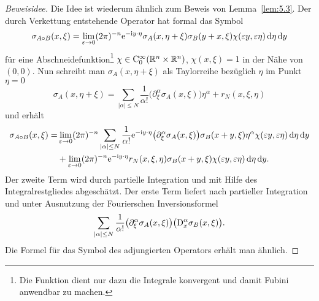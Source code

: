 \begin{proof}[Beweisidee] Die Idee ist wiederum ähnlich zum Beweis von Lemma~\ref{lem:5.3}. Der durch Verkettung entstehende Operator hat formal das Symbol
\begin{equation}
    \sigma_{A\circ B}(x,\xi) = \lim_{\varepsilon\to0}  (2\pi)^{-n} \relax \mathrm e^{-\mathrm i y\cdot\eta  } \sigma_A(x,\eta+\xi) \sigma_B(y+x,\xi) \chi(\varepsilon y,\varepsilon\eta) \,\mathrm d\eta\,\mathrm d y
\end{equation}
für eine Abschneidefunktion\footnote{Die Funktion dient nur dazu die Integrale konvergent und damit Fubini anwendbar zu machen.} $\chi\in\mathrm C_0^\infty(\mathbb R^{n}\times\mathbb R^n)$, $\chi(x,\xi)=1$ in der Nähe von $(0,0)$. Nun schreibt man $\sigma_A(x,\eta+\xi)$ als Taylorreihe bezüglich $\eta$ im Punkt $\eta=0$ 
\begin{equation}
   \sigma_A(x,\eta+\xi) = \sum_{|\alpha|\le N} \frac1{\alpha!} \big(\partial_\xi^\alpha \sigma_A(x,\xi)\big) \eta^\alpha + r_N(x,\xi,\eta)
\end{equation}
und erhält
\begin{equation}
\begin{split}
  \sigma_{A\circ B}(x,\xi) =& \lim_{\varepsilon\to0}  (2\pi)^{-n}  \sum_{|\alpha|\le N}  \frac1{\alpha!} \relax \mathrm e^{-\mathrm i y\cdot\eta  }  \big(\partial_\xi^\alpha \sigma_A(x,\xi)\big) \sigma_B(x+y,\xi)  \eta^\alpha \chi(\varepsilon y, \varepsilon \eta)\,\mathrm d\eta\,\mathrm d y \\
  &+ \lim_{\varepsilon\to0}  (2\pi)^{-n}  \relax \mathrm e^{-\mathrm i y\cdot\eta  }  r_N(x,\xi,\eta) \sigma_B(x+y,\xi)  \chi(\varepsilon y, \varepsilon \eta)\,\mathrm d\eta\,\mathrm d y.
\end{split}
\end{equation}
Der zweite Term wird durch partielle Integration und mit Hilfe des Integralrestgliedes abgeschätzt. Der erste Term liefert nach partieller Integration und unter Ausnutzung der Fourierschen Inversionsformel
\begin{equation}
  \sum_{|\alpha|\le N}  \frac1{\alpha!}  \big(\partial_\xi^\alpha \sigma_A(x,\xi)\big) \big(\mathrm D_x^\alpha \sigma_B(x,\xi)  \big).
\end{equation}
Die Formel für das Symbol des adjungierten Operators erhält man ähnlich.
\end{proof}

